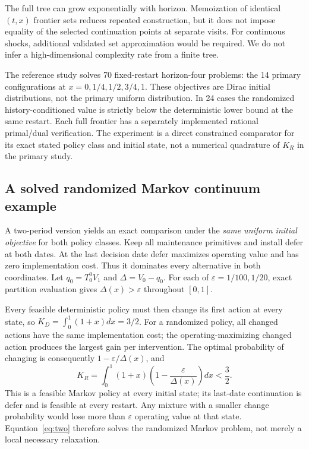 The full tree can grow exponentially with horizon. Memoization of identical $(t,x)$ frontier sets reduces repeated construction, but it does not impose equality of the selected continuation points at separate visits. For continuous shocks, additional validated set approximation would be required. We do not infer a high-dimensional complexity rate from a finite tree.

The reference study solves 70 fixed-restart horizon-four problems: the 14 primary configurations at $x=0,1/4,1/2,3/4,1$. These objectives are Dirac initial distributions, not the primary uniform distribution. In 24 cases the randomized history-conditioned value is strictly below the deterministic lower bound at the same restart. Each full frontier has a separately implemented rational primal/dual verification. The experiment is a direct constrained comparator for its exact stated policy class and initial state, not a numerical quadrature of $K_R$ in the primary study.

\subsection{A solved randomized Markov continuum example}\label{sec:two}
A two-period version yields an exact comparison under the \emph{same uniform initial objective} for both policy classes. Keep all maintenance primitives and install defer at both dates. At the last decision date defer maximizes operating value and has zero implementation cost. Thus it dominates every alternative in both coordinates. Let $q_0=T_0^0V_1$ and $\Delta=V_0-q_0$. For each of $\varepsilon=1/100,1/20$, exact partition evaluation gives $\Delta(x)>\varepsilon$ throughout $[0,1]$.

Every feasible deterministic policy must then change its first action at every state, so $K_D=\int_0^1(1+x)dx=3/2$. For a randomized policy, all changed actions have the same implementation cost; the operating-maximizing changed action produces the largest gain per intervention. The optimal probability of changing is consequently $1-\varepsilon/\Delta(x)$, and
\begin{equation}\label{eq:two}
 K_R=\int_0^1(1+x)\left(1-\frac{\varepsilon}{\Delta(x)}\right)dx<\frac32.
\end{equation}
This is a feasible Markov policy at every initial state; its last-date continuation is defer and is feasible at every restart. Any mixture with a smaller change probability would lose more than $\varepsilon$ operating value at that state. Equation~\eqref{eq:two} therefore solves the randomized Markov problem, not merely a local necessary relaxation.

